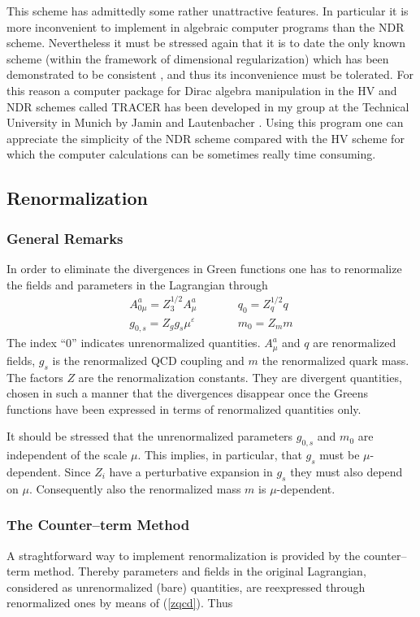 \documentclass[12pt]{article}
\newcommand{\eqn}{\ref}
\begin{document}
\begin{itemize}
 This scheme has admittedly some rather unattractive features.
 In particular it is more
 inconvenient to implement in algebraic computer programs than the
NDR scheme. Nevertheless it
 must
 be stressed again that it is to date the only known scheme (within the
 framework of dimensional regularization) which has been demonstrated to be
 consistent \cite{BM,Bo}, and thus its inconvenience must be tolerated.
For this reason a computer package for Dirac algebra manipulation in 
the HV and NDR
schemes called TRACER has been developed in my group at the Technical
University in Munich by Jamin and Lautenbacher \cite{JaLau}. 
Using this program
one can appreciate the simplicity of the NDR scheme compared with
the HV scheme for which the computer calculations can be sometimes 
really time consuming.

\subsection{Renormalization}
\subsubsection{General Remarks}
In order to eliminate the divergences in Green functions one has to 
renormalize the fields and
parameters in the Lagrangian through
\begin{equation}\label{zqcd}
\begin{array}{lcl}
A^a_{0\mu}=Z^{1/2}_3 A^a_\mu &\qquad& q_0=Z^{1/2}_q q 
 \\
g_{0,s}=Z_g g_s\mu^\varepsilon &\qquad& m_0=Z_m m
\end{array}
\end{equation}
The index ``0'' indicates unrenormalized quantities. $A^a_\mu$ and $q$
are renormalized fields, $g_s$ is the renormalized QCD coupling and $m$
the renormalized quark mass. 
The factors $Z$
are the renormalization constants. They are divergent quantities,
chosen in such a manner that the divergences disappear once the
Greens functions have been expressed in terms of renormalized
quantities only. 

It should be stressed that the unrenormalized parameters
$g_{0,s}$ and $m_0$ are independent of the scale $\mu$. This
implies, in particular, that $g_s$ must be $\mu$-dependent.
Since $Z_i$ have a perturbative expansion in $g_s$ they must
also depend on $\mu$. Consequently also the renormalized mass
$m$ is $\mu$-dependent.
\subsubsection{The Counter--term Method}
A straghtforward way to implement renormalization is provided by the
counter--term method.
Thereby parameters and fields in the
original Lagrangian, considered as unrenormalized
(bare) quantities, are reexpressed through renormalized ones by
means of (\eqn{zqcd}). Thus 


\end{itemize}
\end{document}
